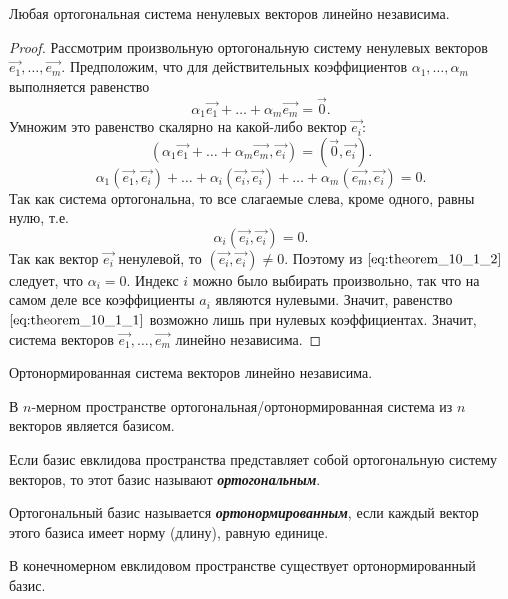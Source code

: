 \begin{theorem}
    Любая ортогональная система ненулевых векторов линейно независима.
\end{theorem}

\begin{proof}
    Рассмотрим произвольную ортогональную систему ненулевых векторов $\vec{e_1}, \ldots, \vec{e_m}$. Предположим, что для действительных коэффициентов $\alpha_1, \ldots, \alpha_m$ выполняется равенство
    \begin{equation}
        \alpha_1\vec{e_1} + \ldots + \alpha_m\vec{e_m} = \vec{0}.
        \label{eq:theorem_10_1_1}
    \end{equation}
    Умножим это равенство скалярно на какой-либо вектор $\vec{e_i}$:
    $$(\alpha_1\vec{e_1} + \ldots + \alpha_m\vec{e_m}, \vec{e_i}) = (\vec{0}, \vec{e_i}).$$
    $$\alpha_1(\vec{e_1}, \vec{e_i}) + \ldots + \alpha_i(\vec{e_i}, \vec{e_i}) + \ldots + \alpha_m(\vec{e_m}, \vec{e_i}) = 0.$$
    Так как система ортогональна, то все слагаемые слева, кроме одного, равны нулю, т.е.
    \begin{equation}
        \alpha_i(\vec{e_i}, \vec{e_i}) = 0.
        \label{eq:theorem_10_1_2}
    \end{equation}
    Так как вектор $\vec{e_i}$ ненулевой, то $(\vec{e_i}, \vec{e_i}) \ne 0$. Поэтому из $\eqref{eq:theorem_10_1_2}$ следует, что $\alpha_i = 0$. Индекс $i$ можно было выбирать произвольно, так что на самом деле все коэффициенты $a_i$ являются нулевыми. Значит, равенство $\eqref{eq:theorem_10_1_1}$ возможно лишь при нулевых коэффициентах. Значит, система векторов $\vec{e_1}, \ldots, \vec{e_m}$ линейно независима.
\end{proof}

\begin{corollary}
    Ортонормированная система векторов линейно независима. 
\end{corollary}

\begin{corollary}
    В $n$-мерном пространстве ортогональная/ортонормированная система из $n$ векторов является базисом.
\end{corollary}

\begin{definition}
    Если базис евклидова пространства представляет собой ортогональную систему векторов, то этот базис называют \textbf{\textit{ортогональным}}.
\end{definition}

\begin{definition}
    Ортогональный базис называется \textbf{\textit{ортонормированным}}, если каждый вектор этого базиса имеет норму (длину), равную единице.
\end{definition}

\begin{theorem}
    В конечномерном евклидовом пространстве существует ортонормированный базис.
\end{theorem}
